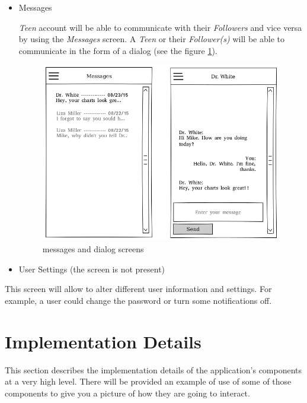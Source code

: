 \documentclass{article}
\begin{document}
    \begin{itemize}
        \item Messages

            \emph{Teen} account will be able to communicate with their \emph{Followers} and vice versa by using the \emph{Messages} screen. A \emph{Teen} or their \emph{Follower(s)} will be able to communicate in the form of a dialog (see the figure \ref{fig:screen_messages}).


            \begin{figure}[h]
                \centering
                \includegraphics[width=\textwidth,height=\textheight,keepaspectratio]{messages.png}
                \caption{messages and dialog screens}
                \label{fig:screen_messages}
            \end{figure}

        \item User Settings (the screen is not present)
    \end{itemize}
            This screen will allow to alter different user information and settings. For example, a user could change the password or turn some notifications off.

\newpage

\section{Implementation Details}

This section describes the implementation details of the application's components at a very high level. There will be provided an example of use of some of those components to give you a picture of how they are going to interact.
\end{document}

